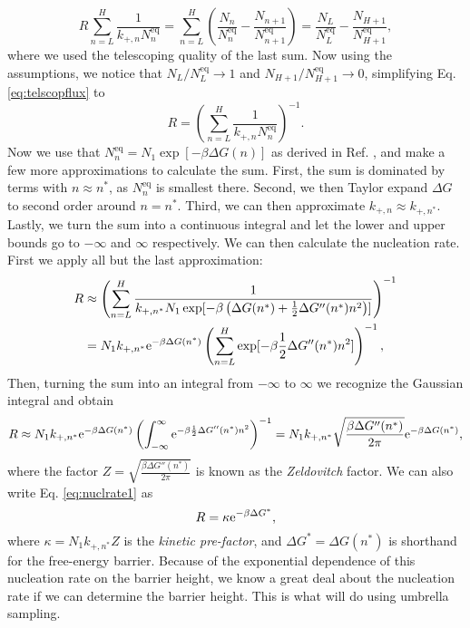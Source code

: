 \documentclass[thesis]{subfiles}
\begin{document}
\begin{equation} \label{eq:telscopflux}
	R\sum_{n=L}^H \frac{1}{k_{+, n} N_n^\textrm{eq}} = \sum_{n=L}^H \left( \frac{N_n}{N_n^\textrm{eq}} - \frac{N_{n + 1}}{N_{n + 1}^\textrm{eq}} \right) =  \frac{N_L}{N_L^\textrm{eq}} - \frac{N_{H + 1}}{N_{H + 1}^\textrm{eq}},
\end{equation}
where we used the telescoping quality of the last sum. Now using the assumptions, we notice that ${N_L}/{N_L^\textrm{eq}} \to 1$ and ${N_{H + 1}}/{N_{H + 1}^\textrm{eq}} \to 0$, simplifying Eq. \ref{eq:telscopflux} to
\begin{equation}
	R = \left( \sum_{n=L}^H \frac{1}{k_{+, n} N_n^\textrm{eq}} \right)^{-1}.
\end{equation}
Now we use that $N_n^\textrm{eq} = N_1 \exp[-\beta\Delta G(n)]$ as derived in Ref. \cite{valeriani2007numerical}, and make a few more approximations to calculate the sum. First, the sum is dominated by terms with $n \approx n^*$, as $N_n^\textrm{eq}$ is smallest there. Second, we then Taylor expand $\Delta G$ to second order around $n = n^*$. Third, we can then approximate $k_{+, n} \approx k_{+, n^*}$. Lastly, we turn the sum into a continuous integral and let the lower and upper bounds go to $-\infty$ and $\infty$ respectively. We can then calculate the nucleation rate. First we apply all but the last approximation:
\begin{align}
	R &\approx \left( \sum_{n=L}^H \frac{1}{k_{+, n^*} N_1 \exp[-\beta \left( \Delta G(n^*) + \frac12  \Delta G'' (n^*) n^2 \right) ] }\right)^{-1} \nonumber\\
	&= N_1 k_{+, n^*} \mathrm{e}^{-\beta \Delta G(n^*) } \left( \sum_{n=L}^H  \exp[-\beta \frac12  \Delta G'' (n^*) n^2 ] \right)^{-1}, \nonumber
\end{align}
Then, turning the sum into an integral from $-\infty$ to $\infty$ we recognize the Gaussian integral and obtain
\begin{equation} \label{eq:nuclrate1}
	R 
	\approx N_1 k_{+, n^*} \mathrm{e}^{-\beta \Delta G(n^*) } \left( \int_{-\infty}^\infty  \mathrm{e}^{-\beta \frac{1}{2}  \Delta G'' (n^*) n^2 } \right)^{-1} 
	= N_1 k_{+, n^*} \sqrt{\frac{\beta\Delta G'' (n^*)}{2\pi}} \mathrm{e}^{-\beta \Delta G(n^*) },
\end{equation}
where the factor $Z = \sqrt{\frac{\beta\Delta G'' (n^*)}{2\pi}}$ is known as the \emph{Zeldovitch} factor. We can also write Eq. \ref{eq:nuclrate1} as 
\begin{equation} \label{eq:nuclrate2}
	R = \kappa \mathrm{e}^{- \beta \Delta G^*},
\end{equation}
where $\kappa = N_1 k_{+, n^*} Z$ is the \emph{kinetic pre-factor}, and $\Delta G^* = \Delta G(n^*)$ is shorthand for the free-energy barrier. Because of the exponential dependence of this nucleation rate on the barrier height, we know a great deal about the nucleation rate if we can determine the barrier height. This is what will do using umbrella sampling.
\end{document}

